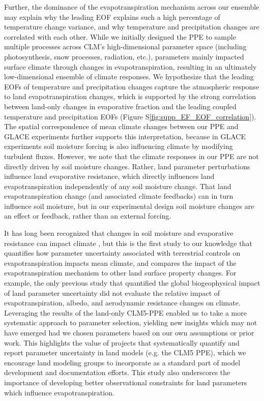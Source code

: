 \documentclass[draft]{agujournal2019}
\begin{document}
Further, the dominance of the evapotranspiration mechanism across our ensemble may explain why the leading EOF explains such a high percentage of temperature change variance, and why temperature and precipitation changes are correlated with each other. While we initially designed the PPE to sample multiple processes across CLM’s high-dimensional parameter space (including photosynthesis, snow processes, radiation, etc.), parameters mainly impacted surface climate through changes in evapotranspiration, resulting in an ultimately low-dimensional ensemble of climate responses. We hypothesize that the leading EOFs of temperature and precipitation changes capture the atmospheric response to land evapotranspiration changes, which is supported by the strong correlation between land-only changes in evaporative fraction and the leading coupled temperature and precipitation EOFs (Figure S\ref{fig:supp_EF_EOF_correlation}). The spatial correspondence of mean climate changes between our PPE and GLACE experiments \citep{seneviratne_impact_2013} further supports this interpretation, because in GLACE experiments soil moisture forcing is also influencing climate by modifying turbulent fluxes. However, we note that the climate responses in our PPE are not directly driven by soil moisture changes. Rather, land parameter perturbations influence land evaporative resistance, which directly influences land evapotranspiration independently of any soil moisture change. That land evapotranspiration change (and associated climate feedbacks) can in turn influence soil moisture, but in our experimental design soil moisture changes are an effect or feedback, rather than an external forcing.

It has long been recognized that changes in soil moisture and evaporative resistance can impact climate \citep{shukla_influence_1982,sellers_comparison_1996,seneviratne_impact_2013,lague_separating_2019}, but this is the first study to our knowledge that quantifies how parameter uncertainty associated with terrestrial controls on evapotranspiration impacts mean climate, and compares the impact of the evapotranspiration mechanism to other land surface property changes. For example, the only previous study that quantified the global biogeophysical impact of land parameter uncertainty \citep{fischer_quantifying_2011} did not evaluate the relative impact of evapotranspiration, albedo, and aerodynamic resistance changes on climate. Leveraging the results of the land-only CLM5-PPE enabled us to take a more systematic approach to parameter selection, yielding new insights which may not have emerged had we chosen parameters based on our own assumptions or prior work. This highlights the value of projects that systematically quantify and report parameter uncertainty in land models (e.g. the CLM5 PPE), which we encourage land modeling groups to incorporate as a standard part of model development and documentation efforts. This study also underscores the importance of developing better observational constraints for land parameters which influence evapotranspiration.
\end{document}
